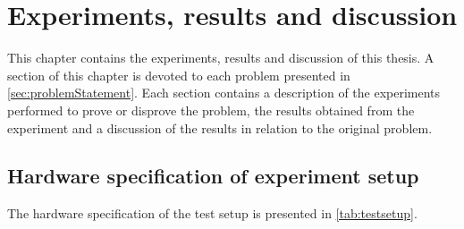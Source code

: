 
\chapter{Experiments, results and discussion}
\label{cha:experiments}
This chapter contains the experiments, results and discussion of this thesis. A section of this chapter is devoted to each problem presented in \cref{sec:problemStatement}. Each section contains a description of the experiments performed to prove or disprove the problem, the results obtained from the experiment and a discussion of the results in relation to the original problem.




\section{Hardware specification of experiment setup}\label{sec:hardwareSepc}
The hardware specification of the test setup is presented in \cref{tab:testsetup}.

